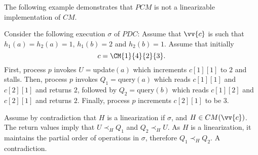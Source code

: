 The following example demonstrates that $PCM$ is not a linearizable implementation of $CM$.


\begin{example}
    Consider the following execution $\sigma$ of $PDC$: Assume that $\vv{c}$ is such that $h_1(a)=h_2(a)=1$, $h_1(b)=2$ and $h_2(b)=1$.
    Assume that initially
    \[ c=\CM{1}{4}{2}{3}.\]
    First, process $p$ invokes $U=${\sc update}$(a)$ which increments $c[1][1]$ to $2$ and stalls.
    Then, process $p$ invokes $Q_1=${\sc query}$(a)$ which reads $c[1][1]$ and $c[2][1]$ and returns $2$,
    followed by $Q_2=${\sc query}$(b)$ which reads $c[1][2]$ and $c[2][1]$ and returns $2$. Finally, process $p$ increments $c[2][1]$ to be $3$.

    Assume by contradiction that $H$ is a linearization if $\sigma$, and $H \in CM(\vv{c})$.
    The return values imply that $U \prec_H Q_1$ and $Q_2 \prec_H U$. As $H$ is a linearization, it maintains
    the partial order of operations in $\sigma$, therefore $Q_1 \prec_H Q_2$. A contradiction.
\end{example}



